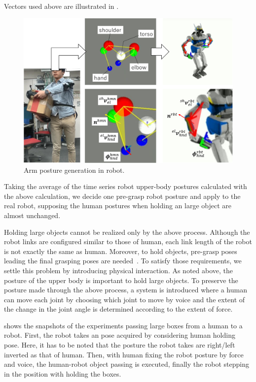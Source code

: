 Vectors used above are illustrated in .

\begin{figure}[htbp]
 \begin{center}
  \includegraphics[width=1.00\columnwidth]{figs/arm_posture2}
  \caption{Arm posture generation in robot.}
  \label{figure:arm_posture}
 \end{center}
\end{figure}

Taking the average of the time series robot upper-body postures calculated with the above calculation, we decide one pre-grasp robot posture and apply to the real robot, supposing the human postures when holding an large object are almost unchanged.

Holding large objects cannot be realized only by the above process. Although the robot links are configured similar to those of human, each link length of the robot is not exactly the same as human. Moreover, to hold objects, pre-grasp poses leading the final grasping poses are needed~\cite{pregrasp}. To satisfy those requirements, we settle this problem by introducing physical interaction. As noted above, the posture of the upper body is important to hold large objects. To preserve the posture made through the above process, a system is introduced where a human can move each joint by choosing which joint to move by voice and the extent of the change in the joint angle is determined according to the extent of force.\par
{} shows the snapshots of the experiments passing large boxes from a human to a robot. First, the robot takes an pose acquired by considering human holding pose. Here, it has to be noted that the posture the robot takes are right/left inverted as that of human. Then, with human fixing the robot posture by force and voice, the human-robot object passing is executed, finally the robot stepping in the position with holding the boxes.

